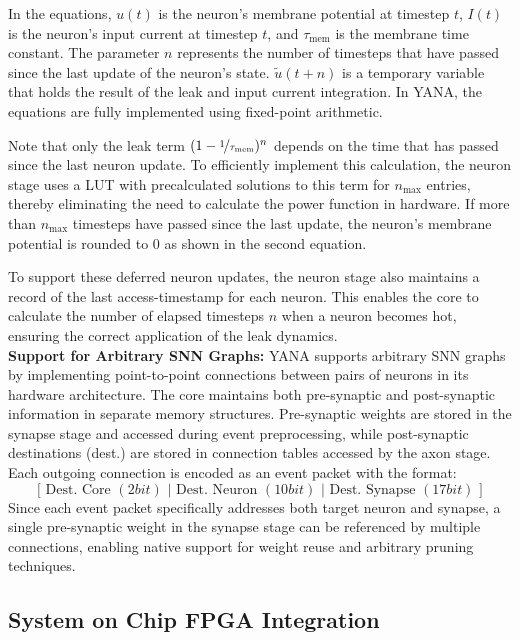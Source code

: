 In the equations, $u(t)$ is the neuron's membrane potential at timestep $t$, $I(t)$ is the neuron's input current at timestep $t$, and $\tau_{\text{mem}}$ is the membrane time constant. The parameter $n$ represents the number of timesteps that have passed since the last update of the neuron's state. $\tilde{u}(t+n)$ is a temporary variable that holds the result of the leak and input current integration. In YANA, the equations are fully implemented using fixed-point arithmetic.

Note that only the leak term $(1 - \nicefrac{1}{\tau_{\text{mem}}})^n$ depends on the time that has passed since the last neuron update. To efficiently implement this calculation, the neuron stage uses a \ac{LUT} with precalculated solutions to this term for $n_{\text{max}}$ entries, thereby eliminating the need to calculate the power function in hardware. If more than $n_{\text{max}}$ timesteps have passed since the last update, the neuron's membrane potential is rounded to 0 as shown in the second equation.

To support these deferred neuron updates, the neuron stage also maintains a record of the last access-timestamp for each neuron. This enables the core to calculate the number of elapsed timesteps $n$ when a neuron becomes hot, ensuring the correct application of the leak dynamics.
\\
\textbf{Support for Arbitrary SNN Graphs:}
YANA supports arbitrary SNN graphs by implementing point-to-point connections between pairs of neurons in its hardware architecture. The core maintains both pre-synaptic and post-synaptic information in separate memory structures. Pre-synaptic weights are stored in the synapse stage and accessed during event preprocessing, while post-synaptic destinations (dest.) are stored in connection tables accessed by the axon stage. Each outgoing connection is encoded as an event packet with the format:
\begin{equation*}
    \text{[ Dest. Core $(2bit)$ | Dest. Neuron $(10bit)$ | Dest. Synapse $(17bit)$ ]}
\end{equation*}
Since each event packet specifically addresses both target neuron and synapse, a single pre-synaptic weight in the synapse stage can be referenced by multiple connections, enabling native support for weight reuse and arbitrary pruning techniques. 

\subsection{System on Chip FPGA Integration}

